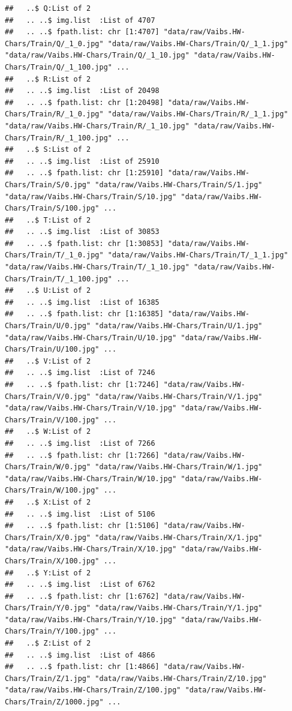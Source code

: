 \documentclass[
]{report}
\begin{document}
\begin{verbatim}
##   ..$ Q:List of 2
##   .. ..$ img.list  :List of 4707
##   .. ..$ fpath.list: chr [1:4707] "data/raw/Vaibs.HW-Chars/Train/Q/_1_0.jpg" "data/raw/Vaibs.HW-Chars/Train/Q/_1_1.jpg" "data/raw/Vaibs.HW-Chars/Train/Q/_1_10.jpg" "data/raw/Vaibs.HW-Chars/Train/Q/_1_100.jpg" ...
##   ..$ R:List of 2
##   .. ..$ img.list  :List of 20498
##   .. ..$ fpath.list: chr [1:20498] "data/raw/Vaibs.HW-Chars/Train/R/_1_0.jpg" "data/raw/Vaibs.HW-Chars/Train/R/_1_1.jpg" "data/raw/Vaibs.HW-Chars/Train/R/_1_10.jpg" "data/raw/Vaibs.HW-Chars/Train/R/_1_100.jpg" ...
##   ..$ S:List of 2
##   .. ..$ img.list  :List of 25910
##   .. ..$ fpath.list: chr [1:25910] "data/raw/Vaibs.HW-Chars/Train/S/0.jpg" "data/raw/Vaibs.HW-Chars/Train/S/1.jpg" "data/raw/Vaibs.HW-Chars/Train/S/10.jpg" "data/raw/Vaibs.HW-Chars/Train/S/100.jpg" ...
##   ..$ T:List of 2
##   .. ..$ img.list  :List of 30853
##   .. ..$ fpath.list: chr [1:30853] "data/raw/Vaibs.HW-Chars/Train/T/_1_0.jpg" "data/raw/Vaibs.HW-Chars/Train/T/_1_1.jpg" "data/raw/Vaibs.HW-Chars/Train/T/_1_10.jpg" "data/raw/Vaibs.HW-Chars/Train/T/_1_100.jpg" ...
##   ..$ U:List of 2
##   .. ..$ img.list  :List of 16385
##   .. ..$ fpath.list: chr [1:16385] "data/raw/Vaibs.HW-Chars/Train/U/0.jpg" "data/raw/Vaibs.HW-Chars/Train/U/1.jpg" "data/raw/Vaibs.HW-Chars/Train/U/10.jpg" "data/raw/Vaibs.HW-Chars/Train/U/100.jpg" ...
##   ..$ V:List of 2
##   .. ..$ img.list  :List of 7246
##   .. ..$ fpath.list: chr [1:7246] "data/raw/Vaibs.HW-Chars/Train/V/0.jpg" "data/raw/Vaibs.HW-Chars/Train/V/1.jpg" "data/raw/Vaibs.HW-Chars/Train/V/10.jpg" "data/raw/Vaibs.HW-Chars/Train/V/100.jpg" ...
##   ..$ W:List of 2
##   .. ..$ img.list  :List of 7266
##   .. ..$ fpath.list: chr [1:7266] "data/raw/Vaibs.HW-Chars/Train/W/0.jpg" "data/raw/Vaibs.HW-Chars/Train/W/1.jpg" "data/raw/Vaibs.HW-Chars/Train/W/10.jpg" "data/raw/Vaibs.HW-Chars/Train/W/100.jpg" ...
##   ..$ X:List of 2
##   .. ..$ img.list  :List of 5106
##   .. ..$ fpath.list: chr [1:5106] "data/raw/Vaibs.HW-Chars/Train/X/0.jpg" "data/raw/Vaibs.HW-Chars/Train/X/1.jpg" "data/raw/Vaibs.HW-Chars/Train/X/10.jpg" "data/raw/Vaibs.HW-Chars/Train/X/100.jpg" ...
##   ..$ Y:List of 2
##   .. ..$ img.list  :List of 6762
##   .. ..$ fpath.list: chr [1:6762] "data/raw/Vaibs.HW-Chars/Train/Y/0.jpg" "data/raw/Vaibs.HW-Chars/Train/Y/1.jpg" "data/raw/Vaibs.HW-Chars/Train/Y/10.jpg" "data/raw/Vaibs.HW-Chars/Train/Y/100.jpg" ...
##   ..$ Z:List of 2
##   .. ..$ img.list  :List of 4866
##   .. ..$ fpath.list: chr [1:4866] "data/raw/Vaibs.HW-Chars/Train/Z/1.jpg" "data/raw/Vaibs.HW-Chars/Train/Z/10.jpg" "data/raw/Vaibs.HW-Chars/Train/Z/100.jpg" "data/raw/Vaibs.HW-Chars/Train/Z/1000.jpg" ...
\end{verbatim}
\end{document}
